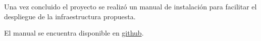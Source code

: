 \newpage
{}\label{appendix:Manual de instalación}
Una vez concluido el proyecto se realiz\'o un manual de instalaci\'on para facilitar el despliegue de la infraestructura propuesta.

El manual se encuentra disponible en \href{https://github.com/JoseDRojasA/thesis-files/raw/master/Manual de instalación.pdf}{github}.
